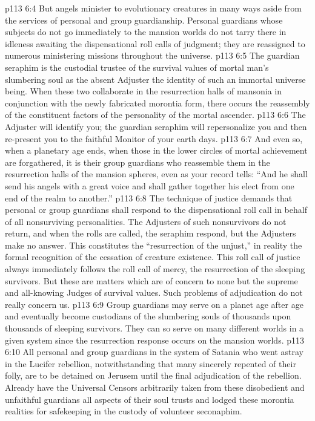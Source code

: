 \pc \vs p113 6:4 But angels minister to evolutionary creatures in many ways aside from the services of personal and group guardianship. Personal guardians whose subjects do not go immediately to the mansion worlds do not tarry there in idleness awaiting the dispensational roll calls of judgment; they are reassigned to numerous ministering missions throughout the universe.
\vs p113 6:5 The guardian seraphim is the custodial trustee of the survival values of mortal man’s slumbering soul as the absent Adjuster  the identity of such an immortal universe being. When these two collaborate in the resurrection halls of mansonia in conjunction with the newly fabricated morontia form, there occurs the reassembly of the constituent factors of the personality of the mortal ascender.
\vs p113 6:6 The Adjuster will identify you; the guardian seraphim will repersonalize you and then re\hyp{}present you to the faithful Monitor of your earth days.
\vs p113 6:7 And even so, when a planetary age ends, when those in the lower circles of mortal achievement are forgathered, it is their group guardians who reassemble them in the resurrection halls of the mansion spheres, even as your record tells: “And he shall send his angels with a great voice and shall gather together his elect from one end of the realm to another.”
\pc \vs p113 6:8 The technique of justice demands that personal or group guardians shall respond to the dispensational roll call in behalf of all nonsurviving personalities. The Adjusters of such nonsurvivors do not return, and when the rolls are called, the seraphim respond, but the Adjusters make no answer. This constitutes the “resurrection of the unjust,” in reality the formal recognition of the cessation of creature existence. This roll call of justice always immediately follows the roll call of mercy, the resurrection of the sleeping survivors. But these are matters which are of concern to none but the supreme and all\hyp{}knowing Judges of survival values. Such problems of adjudication do not really concern us.
\pc \vs p113 6:9 Group guardians may serve on a planet age after age and eventually become custodians of the slumbering souls of thousands upon thousands of sleeping survivors. They can so serve on many different worlds in a given system since the resurrection response occurs on the mansion worlds.
\vs p113 6:10 All personal and group guardians in the system of Satania who went astray in the Lucifer rebellion, notwithstanding that many sincerely repented of their folly, are to be detained on Jerusem until the final adjudication of the rebellion. Already have the Universal Censors arbitrarily taken from these disobedient and unfaithful guardians all aspects of their soul trusts and lodged these morontia realities for safekeeping in the custody of volunteer seconaphim.\plusone
